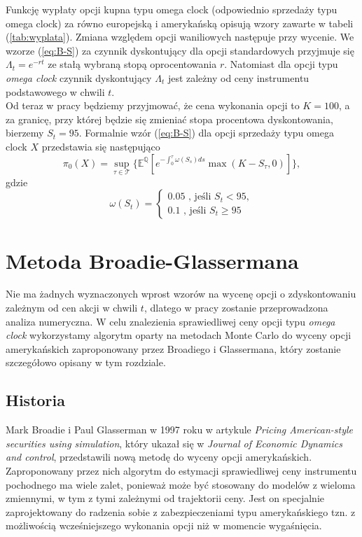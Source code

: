 \documentclass[]{pwr_wmat_praca_dyplomowa}
\theoremstyle{plain}
\numberwithin{theorem}{chapter}
\theoremstyle{definition}
\numberwithin{theorem}{chapter}
\begin{document}
Funkcję wypłaty opcji kupna typu omega clock (odpowiednio sprzedaży typu omega clock) za równo europejską i amerykańską opisują wzory zawarte w tabeli (\ref{tab:wyplata}).
Zmiana względem opcji waniliowych następuje przy wycenie. We wzorze (\ref{eq:B-S}) za czynnik dyskontujący dla opcji standardowych przyjmuje się $\Lambda_t = e^{-rt}$ ze stałą wybraną stopą oprocentowania $r$. Natomiast dla opcji typu \textit{omega clock} czynnik dyskontujący $\Lambda_t$ jest zależny od ceny instrumentu podstawowego w chwili $t$.\\

Od teraz w pracy będziemy przyjmować, że cena wykonania opcji to $K = 100$, a za granicę, przy której będzie się zmieniać stopa procentowa dyskontowania, bierzemy $S_t = 95$. Formalnie wzór (\ref{eq:B-S}) dla opcji sprzedaży typu omega clock $X$ przedstawia się następująco
\begin{equation}
\label{eq:B-S_omega}
\pi_0(X) = \sup_{\tau \in \mathcal{T}}\{ \mathbb{E}^{\mathbb{Q}} [e^{-\int_0^{\tau} \omega(S_s)ds} \max(K-S_{\tau},0)] \},
\end{equation}
gdzie
\begin{equation}
\label{eq:r}
\omega(S_t)=  \left\{ \begin{array}{ll}
0.05 \textrm{ , jeśli }S_t <95,\\
0.1 \textrm { , jeśli }S_t \geq 95
\end{array} \right.
\end{equation}
\chapter{Metoda Broadie-Glassermana}

Nie ma żadnych wyznaczonych wprost wzorów na wycenę opcji o zdyskontowaniu zależnym od cen akcji w chwili $t$, dlatego w pracy zostanie przeprowadzona analiza numeryczna.
\newline
\newline
W celu znalezienia sprawiedliwej ceny opcji typu \textit{omega clock} wykorzystamy algorytm oparty na metodach Monte Carlo do wyceny opcji amerykańskich zaproponowany przez Broadiego i Glassermana, który zostanie szczegółowo opisany w tym rozdziale.

\section{Historia}
Mark Broadie i Paul Glasserman w 1997 roku w artykule \textit{Pricing American-style securities using simulation}, który ukazał się w \textit{Journal of Economic Dynamics and control}, przedstawili nową metodę do wyceny opcji amerykańskich. Zaproponowany przez nich algorytm do estymacji sprawiedliwej ceny instrumentu pochodnego ma wiele zalet, ponieważ może być stosowany do modelów z wieloma zmiennymi, w tym z tymi zależnymi od trajektorii ceny. Jest on specjalnie zaprojektowany do radzenia sobie z zabezpieczeniami typu amerykańskiego tzn. z możliwością wcześniejszego wykonania opcji niż w momencie wygaśnięcia.\\
\end{document}
